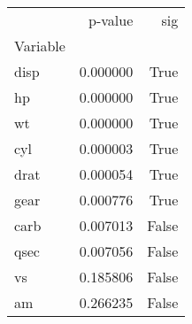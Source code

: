 \begin{tabular}{lrr}
\toprule
 & p-value & sig \\
Variable &  &  \\
\midrule
disp & 0.000000 & True \\
hp & 0.000000 & True \\
wt & 0.000000 & True \\
cyl & 0.000003 & True \\
drat & 0.000054 & True \\
gear & 0.000776 & True \\
carb & 0.007013 & False \\
qsec & 0.007056 & False \\
vs & 0.185806 & False \\
am & 0.266235 & False \\
\bottomrule
\end{tabular}
